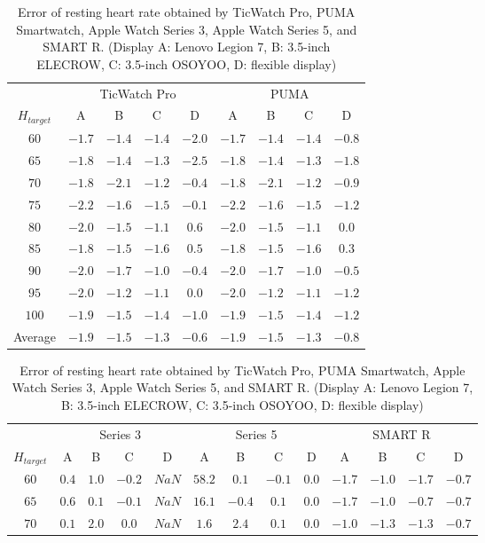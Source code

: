 \documentclass[sigchi,authordraft]{acmart}
\begin{document}
\begin{table}[!t]
  \small
  \centering
  \caption{Error of resting heart rate obtained by TicWatch Pro, PUMA Smartwatch, Apple Watch Series 3, Apple Watch Series 5, and SMART R. (Display A: Lenovo Legion 7, B: 3.5-inch ELECROW, C: 3.5-inch OSOYOO, D: flexible display)}
  \begin{tabular}{c|cccc|cccc}
  \toprule
    &\multicolumn{4}{c|}{TicWatch Pro}&\multicolumn{4}{c}{PUMA} \\
    $H_{target}$ & A & B & C & D & A & B & C & D \\
    \midrule
    $60$ & $-1.7$ & $-1.4$ & $-1.4$ & $-2.0$ & $-1.7$ & $-1.4$ & $-1.4$ & $-0.8$ \\
    $65$ & $-1.8$ & $-1.4$ & $-1.3$ & $-2.5$ & $-1.8$ & $-1.4$ & $-1.3$ & $-1.8$ \\
    $70$ & $-1.8$ & $-2.1$ & $-1.2$ & $-0.4$ & $-1.8$ & $-2.1$ & $-1.2$ & $-0.9$ \\
    $75$ & $-2.2$ & $-1.6$ & $-1.5$ & $-0.1$ & $-2.2$ & $-1.6$ & $-1.5$ & $-1.2$ \\
    $80$ & $-2.0$ & $-1.5$ & $-1.1$ & $0.6$ & $-2.0$ & $-1.5$ & $-1.1$ & $0.0$ \\
    $85$ & $-1.8$ & $-1.5$ & $-1.6$ & $0.5$ & $-1.8$ & $-1.5$ & $-1.6$ & $0.3$ \\
    $90$ & $-2.0$ & $-1.7$ & $-1.0$ & $-0.4$ & $-2.0$ & $-1.7$ & $-1.0$ & $-0.5$ \\
    $95$ & $-2.0$ & $-1.2$ & $-1.1$ & $0.0$ & $-2.0$ & $-1.2$ & $-1.1$ & $-1.2$ \\
    $100$ & $-1.9$ & $-1.5$ & $-1.4$ & $-1.0$ & $-1.9$ & $-1.5$ & $-1.4$ & $-1.2$ \\
    \midrule
    Average & $-1.9$ & $-1.5$ & $-1.3$ & $-0.6$ & $-1.9$ & $-1.5$ & $-1.3$ & $-0.8$ \\
    \bottomrule
  \end{tabular}
  \begin{tabular}{c|cccc|cccc|cccc}
  \toprule
    &\multicolumn{4}{c|}{Series 3}&\multicolumn{4}{c|}{Series 5}&\multicolumn{4}{c}{SMART R} \\
    $H_{target}$ & A & B & C & D & A & B & C & D & A & B & C & D \\
    \midrule
    $60$ & $0.4$ & $1.0$ & $-0.2$ & $NaN$ & $58.2$ & $0.1$ & $-0.1$ & $0.0$ & $-1.7$ & $-1.0$ & $-1.7$ & $-0.7$ \\
    $65$ & $0.6$ & $0.1$ & $-0.1$ & $NaN$ & $16.1$ & $-0.4$ & $0.1$ & $0.0$ & $-1.7$ & $-1.0$ & $-0.7$ & $-0.7$ \\
    $70$ & $0.1$ & $2.0$ & $0.0$ & $NaN$ & $1.6$ & $2.4$ & $0.1$ & $0.0$ & $-1.0$ & $-1.3$ & $-1.3$ & $-0.7$ \\

\end{tabular}
\end{table}
\end{document}
